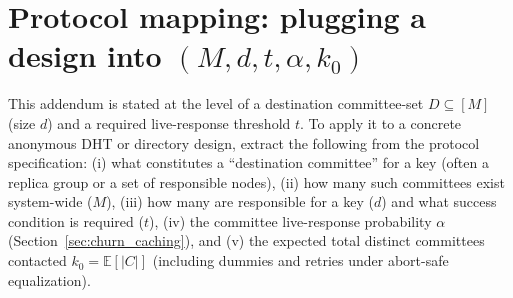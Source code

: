 \documentclass[11pt]{article}
\newcommand{\E}{\mathbb{E}}
\begin{document}
\section{Protocol mapping: plugging a design into \texorpdfstring{$(M,d,t,\alpha,k_0)$}{(M,d,t,alpha,k0)}}\label{sec:protocol-mapping}

This addendum is stated at the level of a destination committee-set $D\subseteq[M]$ (size $d$) and a required live-response threshold $t$.
To apply it to a concrete anonymous DHT or directory design, extract the following from the protocol specification:
(i) what constitutes a ``destination committee'' for a key (often a replica group or a set of responsible nodes),
(ii) how many such committees exist system-wide ($M$),
(iii) how many are responsible for a key ($d$) and what success condition is required ($t$),
(iv) the committee live-response probability $\alpha$ (Section~\ref{sec:churn_caching}), and
(v) the expected total distinct committees contacted $k_0=\E[|C|]$ (including dummies and retries under abort-safe equalization).
\end{document}
